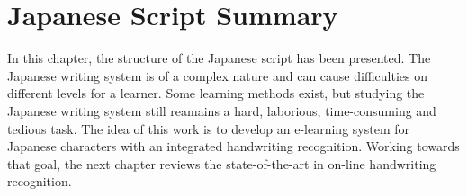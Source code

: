 
\section{Japanese Script Summary}
\label{sec:jap:summary}

In this chapter, the structure of the Japanese script has been presented.
The Japanese writing system is of a complex nature and can cause difficulties
on different levels for a learner. Some learning methods exist, but studying
the Japanese writing system still reamains a hard, laborious,  
time-consuming and tedious task.
The idea of this work is to develop an e-learning system for Japanese characters
with an integrated handwriting recognition.
Working towards that goal, the next chapter reviews the state-of-the-art in 
on-line handwriting recognition.
